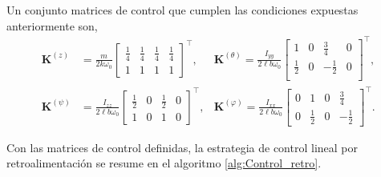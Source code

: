 Un conjunto matrices de control que cumplen las condiciones expuestas anteriormente son,
\begin{align}
    \mathbf{K}^{(z)} &= \frac{m}{2k \omega_0}
    \begin{bmatrix}
        \frac{1}{4}& \frac{1}{4}& \frac{1}{4}& \frac{1}{4} \\
        1 & 1 & 1 & 1
    \end{bmatrix}^{\top}, 
    &\mathbf{K}^{(\theta)} = \frac{I_{yy}}{2\ell b\omega_0} 
    \begin{bmatrix}
        1 & 0 & \frac{3}{4} & 0 \\ 
        \frac{1}{2} & 0 & -\frac{1}{2} & 0 \\
    \end{bmatrix}^{\top},\\
    \mathbf{K}^{(\psi)} &= \frac{I_{zz}}{2\ell b\omega_0}
    \begin{bmatrix}
        \frac{1}{2} & 0 & \frac{1}{2} & 0 \\
        1 & 0 & 1 & 0
    \end{bmatrix}^{\top},
    &\mathbf{K}^{(\varphi)} = \frac{I_{xx}} {2\ell b\omega_0}
    \begin{bmatrix}
        0 & 1 & 0 & \frac{3}{4} \\
        0 & \frac{1}{2} & 0 & -\frac{1}{2}
    \end{bmatrix}^{\top}.
\end{align}

Con las matrices de control definidas, la estrategia de control lineal por retroalimentación se resume en el algoritmo \ref{alg:Control_retro}.

\begin{algorithm}[H]
    \caption{Control por retroalimentación de estados para sistema dinámico de cuadricóptero}
    \label{alg:Control_retro}
\end{algorithm}

